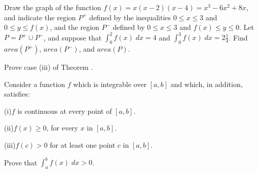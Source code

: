 \begin{exercises}
Draw the graph of the function
$f(x) = x(x-2)(x-4) = x^3 - 6x^2 + 8x$,
and indicate the region $P^+$  defined by the inequalities
$0 \leq x \leq 3$ and $0 \leq y \leq f(x)$, and the region
$P^-$ defined by $0 \leq x \leq 3$ and $f(x) \leq y \leq 0$.
Let $P = P^+ \cup P^-$, and suppose that
$\int_0^2 f(x) \; dx = 4$ and $\int_0^3 f(x) \; dx = 2\frac14$.
Find $\mathit{area}(P^+)$, $\mathit{area}(P^-)$,
and $\mathit{area}(P)$.

Prove case (iii) of Theorem .

Consider a function $f$ which is integrable over
$[a,b]$ and which, in addition, satisfies:

(i)$f$ is continuous at every point of $[a,b]$.

(ii)$f(x) \geq 0$, for every $x$ in $[a,b]$.

(iii)$f(c) > 0$ for at least one point $c$ in $[a,b]$.

Prove that $\int_a^b f(x) \; dx > 0$.

\end{exercises}
